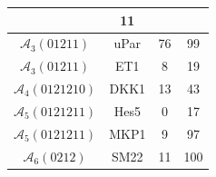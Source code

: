 \begin{table}[!t]
\begin{tabular}{|c|c||c|c|}
&

11

\\ \hline

$\mathcal{A}_{3}(01211)$

&

uPar

&

76

&

99

\\ \hline

$\mathcal{A}_{3}(01211)$

&

ET1

&

8

&

19

\\ \hline

$\mathcal{A}_{4}(0121210)$

&

DKK1

&

13

&

43

\\ \hline

$\mathcal{A}_{5}(0121211)$

&

Hes5


&

0

&

17

\\ \hline

$\mathcal{A}_{5}(0121211)$

&

MKP1


&

9

&

97

\\ \hline

$\mathcal{A}_{6}(0212)$

&

SM22


&

11

&

100


\end{tabular}
\end{table}
